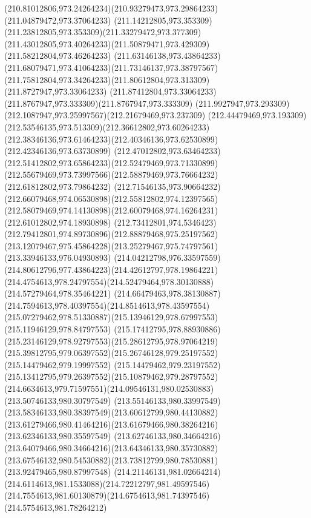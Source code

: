 {{	\curveto(210.81012806,973.24264234)(210.93279473,973.29864233)(211.04879472,973.37064233)
	\curveto(211.14212805,973.353309)(211.23812805,973.353309)(211.33279472,973.377309)
	\curveto(211.43012805,973.40264233)(211.50879471,973.429309)(211.58212804,973.46264233)
	\curveto(211.63146138,973.43864233)(211.68079471,973.41064233)(211.73146137,973.38797567)
	\curveto(211.75812804,973.34264233)(211.80612804,973.313309)(211.8727947,973.33064233)
	\curveto(211.87412804,973.33064233)(211.8767947,973.333309)(211.8767947,973.333309)
	\curveto(211.9927947,973.293309)(212.1087947,973.25997567)(212.21679469,973.237309)
	\curveto(212.44479469,973.193309)(212.53546135,973.513309)(212.36612802,973.60264233)
	\curveto(212.38346136,973.61464233)(212.40346136,973.62530899)(212.42346136,973.63730899)
	\curveto(212.47012802,973.63464233)(212.51412802,973.65864233)(212.52479469,973.71330899)
	\curveto(212.55679469,973.73997566)(212.58879469,973.76664232)(212.61812802,973.79864232)
	\curveto(212.71546135,973.90664232)(212.66079468,974.06530898)(212.55812802,974.12397565)
	\curveto(212.58079469,974.14130898)(212.60079468,974.16264231)(212.61012802,974.18930898)
	\curveto(212.73412801,974.5346423)(212.79412801,974.89730896)(212.88879468,975.25197562)
	\curveto(213.12079467,975.45864228)(213.25279467,975.74797561)(213.33946133,976.04930893)
	\curveto(214.04212798,976.33597559)(214.80612796,977.43864223)(214.42612797,978.19864221)
	\curveto(214.4754613,978.24797554)(214.52479464,978.30130888)(214.57279464,978.35464221)
	\curveto(214.66479463,978.38130887)(214.7594613,978.40397554)(214.8514613,978.43597554)
	\curveto(215.07279462,978.51330887)(215.13946129,978.67997553)(215.11946129,978.84797553)
	\curveto(215.17412795,978.88930886)(215.23146129,978.92797553)(215.28612795,978.97064219)
	\curveto(215.39812795,979.06397552)(215.26746128,979.25197552)(215.14479462,979.19997552)
	\curveto(215.14479462,979.23197552)(215.13412795,979.26397552)(215.10879462,979.28797552)
	\curveto(214.6634613,979.71597551)(214.09546131,980.02530883)(213.50746133,980.30797549)
	\curveto(213.55146133,980.33997549)(213.58346133,980.38397549)(213.60612799,980.44130882)
	\curveto(213.61279466,980.41464216)(213.61679466,980.38264216)(213.62346133,980.35597549)
	\curveto(213.62746133,980.34664216)(213.64079466,980.34664216)(213.64346133,980.35730882)
	\curveto(213.67546132,980.54530882)(213.73812799,980.78530881)(213.92479465,980.87997548)
	\curveto(214.21146131,981.02664214)(214.6114613,981.1533088)(214.72212797,981.49597546)
	\curveto(214.7554613,981.60130879)(214.6754613,981.74397546)(214.5754613,981.78264212)
}}
